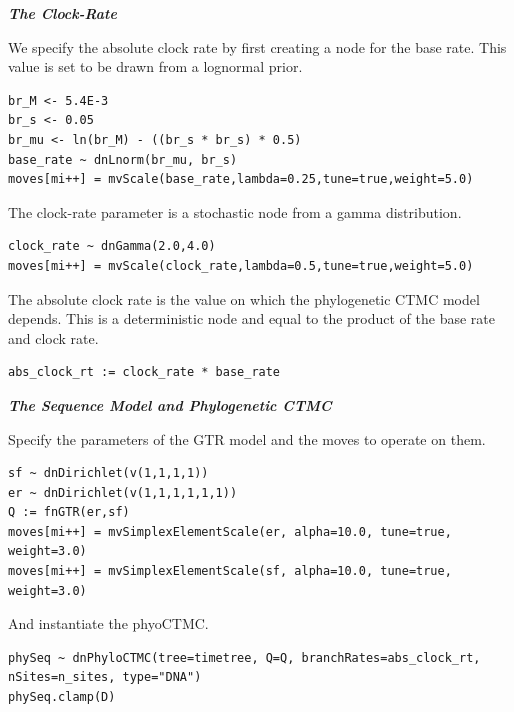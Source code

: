 \textbf{\textit{The Clock-Rate}}

We specify the absolute clock rate by first creating a node for the base rate.
This value is set to be drawn from a lognormal prior.
{\tt \begin{snugshade*}
\begin{lstlisting}
br_M <- 5.4E-3
br_s <- 0.05
br_mu <- ln(br_M) - ((br_s * br_s) * 0.5)
base_rate ~ dnLnorm(br_mu, br_s)
moves[mi++] = mvScale(base_rate,lambda=0.25,tune=true,weight=5.0)
\end{lstlisting}
\end{snugshade*}}

The clock-rate parameter is a stochastic node from a gamma distribution.
{\tt \begin{snugshade*}
\begin{lstlisting}
clock_rate ~ dnGamma(2.0,4.0)
moves[mi++] = mvScale(clock_rate,lambda=0.5,tune=true,weight=5.0)
\end{lstlisting}
\end{snugshade*}}

The absolute clock rate is the value on which the phylogenetic CTMC model depends. This is a deterministic node and equal to the product of the base rate and clock rate.
{\tt \begin{snugshade*}
\begin{lstlisting}
abs_clock_rt := clock_rate * base_rate
\end{lstlisting}
\end{snugshade*}}

\textbf{\textit{The Sequence Model and Phylogenetic CTMC}}

Specify the parameters of the GTR model and the moves to operate on them.
{\tt \begin{snugshade*}
\begin{lstlisting}
sf ~ dnDirichlet(v(1,1,1,1))
er ~ dnDirichlet(v(1,1,1,1,1,1))
Q := fnGTR(er,sf)
moves[mi++] = mvSimplexElementScale(er, alpha=10.0, tune=true, weight=3.0)
moves[mi++] = mvSimplexElementScale(sf, alpha=10.0, tune=true, weight=3.0)
\end{lstlisting}
\end{snugshade*}}

And instantiate the phyoCTMC.
{\tt \begin{snugshade*}
\begin{lstlisting}
phySeq ~ dnPhyloCTMC(tree=timetree, Q=Q, branchRates=abs_clock_rt, nSites=n_sites, type="DNA")
phySeq.clamp(D)
\end{lstlisting}
\end{snugshade*}}

